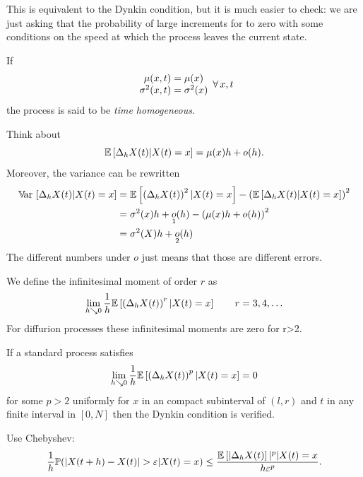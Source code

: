 \documentclass[12pt]{report}
\begin{document}
This is equivalent to the Dynkin condition, but it is much easier to check: we are just asking that the probability of large increments for to zero with some conditions on the speed at which the process leaves the current state.
\begin{definition}
	If
	\begin{equation*}
		\begin{array}{c}
			\mu(x,t)=\mu(x)\\
			\sigma^{2}(x,t)=\sigma^{2}(x)
		\end{array}\forall\, x,t
	\end{equation*}
	the process is said to be \emph{time homogeneous}.
\end{definition}
\begin{remark}
	Think about
	\begin{equation*}
		\mathbb{E}\left[\Delta_{h}X(t)|X(t)=x\right]=\mu(x)h+o(h).
	\end{equation*}
	Moreover, the variance can be rewritten
	\begin{align*}
		\mathbb{V}\!\mathrm{ar}\,\left[\Delta_{h} X(t)|X(t)=x\right]&=\mathbb{E}\left[\left(\Delta_{h}X(t)\right)^{2}|X(t)=x\right]-\left(\mathbb{E}\left[\Delta_{h}X(t)|X(t)=x\right]\right)^{2}\\
		&=\sigma^{2}(x)h+\underset{1}{o}(h)-\left(\mu(x)h+o(h)\right)^{2}\\
		&=\sigma^{2}(X)h+\underset{2}{o}(h)
	\end{align*}
	The different numbers under $o$ just means that those are different errors.
\end{remark}
\begin{definition}
	We define the infinitesimal moment of order $r$ as
	\begin{equation*}
		\lim_{h\searrow0}\frac{1}{h}\mathbb{E}\left[\left(\Delta_{h}X(t)\right)^{r}|X(t)=x\right]\qquad r=3,4,\ldots
	\end{equation*}
	For diffurion processes these infinitesimal moments are zero for r>2.
\end{definition}
\begin{lemma}
	If a standard process satisfies
	\begin{equation*}
		\lim_{h\searrow0}\frac{1}{h}\mathbb{E}\left[\left(\Delta_{h}X(t)\right)^{p}|X(t)=x\right]=0
	\end{equation*}
	for some $p>2$ uniformly for $x$ in an compact subinterval of $(l,r)$ and $t$ in any finite interval in $[0,N]$ then the Dynkin condition is verified.
\end{lemma}
\begin{fancyproof}
	Use Chebyshev:
	\begin{equation*}
		\frac{1}{h}\pr(|X(t+h)-X(t)|>\varepsilon|X(t)=x)\leq\frac{\ev{|\Delta_{h}X(t)}|^{p}|X(t)=x}{h\varepsilon^{p}}.
	\end{equation*}
\end{fancyproof}
\end{document}
